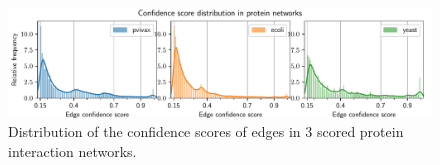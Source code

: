 \begin{figure}
    \includegraphics[width=\linewidth]{histogram_edges.pdf}
    \caption{Distribution of the confidence scores of edges in 3 scored protein interaction networks.}
    \label{fig:histogram_edges}
\end{figure}
